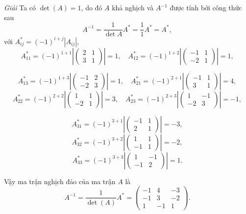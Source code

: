 \textit{Giải}
Ta có \(\det(A) = 1\), do đó \(A\) khả nghịch và \(A^{-1}\) được tính bởi công thức sau
\[
A^{-1} = \frac{1}{\det A} A^* = \frac{1}{1} A^* = A^*,
\]
với \(A_{ij}^* = (-1)^{i+j} \left|A_{ij}\right|\),
\[
A_{11}^* = (-1)^{1+1} \left| \begin{pmatrix}
2 & 1 \\
3 & 1
\end{pmatrix} \right| = 1, \quad A_{12}^* = (-1)^{1+2} \left| \begin{pmatrix}
-1 & 1 \\
-2 & 1
\end{pmatrix} \right| = 1,
\]

\[
A_{13}^* = (-1)^{1+3} \left| \begin{pmatrix}
-1 & 2 \\
-2 & 3
\end{pmatrix} \right| = 1, \quad A_{21}^* = (-1)^{2+1} \left| \begin{pmatrix}
-1 & 1 \\
3 & 1
\end{pmatrix} \right| = 4,
\]
\[ A_{22}^* = (-1)^{2+2} \left| \begin{pmatrix}
1 & 1 \\
-2 & 1
\end{pmatrix} \right| = 3, \quad A_{23}^* = (-1)^{2+3} \left| \begin{pmatrix}
1 & -1 \\
-2 & 3
\end{pmatrix} \right| = -1,
\]

\[
A_{31}^* = (-1)^{3+1} \left| \begin{pmatrix}
-1 & 1 \\
2 & 1
\end{pmatrix} \right| = -3, 
\]
\[
A_{32}^* = (-1)^{3+2} \left| \begin{pmatrix}
1 & 1 \\
-1 & 1
\end{pmatrix} \right| = -2,
\]
\[
A_{33}^* = (-1)^{3+3} \left| \begin{pmatrix}
1 & -1 \\
-1 & 2
\end{pmatrix} \right| = 1.
\]

Vậy ma trận nghịch đảo của ma trận \(A\) là
\[
A^{-1} = \frac{1}{\det(A)} A^* = \begin{pmatrix}
-1 & 4 & -3 \\
-1 & 3 & -2 \\
1 & -1 & 1
\end{pmatrix}.
\]

